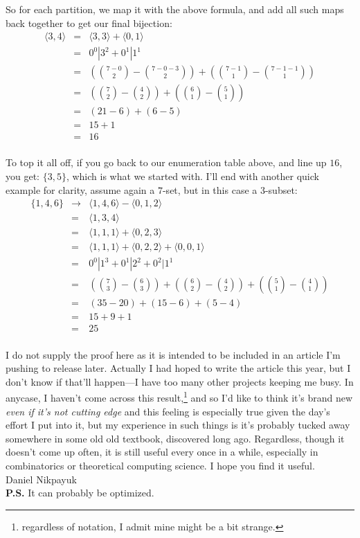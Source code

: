 \documentclass[twoside]{article}
\begin{document}
So for each partition, we map it with the above formula, and add all such maps back together to get our final bijection:
\begin{eqnarray*}
\langle 3, 4\rangle & = & \langle 3, 3\rangle + \langle 0, 1\rangle \\
       & = & 0^0|3^2 + 0^1|1^1 \\
       & = & ({7-0\choose 2} - {7-0-3\choose 2}) + ({7-1\choose 1} - {7-1-1\choose 1}) \\
       & = & ({7\choose 2} - {4\choose 2}) + ({6\choose 1} - {5\choose 1}) \\
       & = & (21 - 6) + (6 - 5) \\
       & = & 15 + 1 \\
       & = & 16 \\
\end{eqnarray*}

To top it all off, if you go back to our enumeration table above, and line up $ 16 $, you get: $ \{3, 5\} $, which is what
we started with.  I'll end with another quick example for clarity, assume again a $ 7 $-set, but in this case a $ 3 $-subset:
\begin{eqnarray*}
\{1, 4, 6\} & \to & \langle 1, 4, 6\rangle - \langle 0, 1, 2\rangle \\
            & = & \langle 1, 3, 4\rangle \\
            & = & \langle 1, 1, 1\rangle + \langle 0, 2, 3\rangle \\
            & = & \langle 1, 1, 1\rangle + \langle 0, 2, 2\rangle + \langle 0, 0, 1\rangle \\
            & = & 0^0|1^3 + 0^1|2^2 + 0^2|1^1 \\
            & = & ({7\choose 3} - {6\choose 3}) + ({6\choose 2} - {4\choose 2}) + ({5\choose 1} - {4\choose 1}) \\
            & = & (35 - 20) + (15 - 6) + (5 - 4) \\
            & = & 15 + 9 + 1 \\
            & = & 25 \\
\end{eqnarray*}

I do not supply the proof here as it is intended to be included in an article I'm pushing to release later. Actually I had hoped
to write the article this year, but I don't know if that'll happen---I have too many other projects keeping me busy. In anycase,
I haven't come across this result,\footnote{regardless of notation, I admit mine might be a bit strange.} and so I'd like to think
it's brand new \emph{even if it's not cutting edge} and this feeling is especially true given the day's effort I put into it,
but my experience in such things is it's probably tucked away somewhere in some old old textbook, discovered long ago. Regardless,
though it doesn't come up often, it is still useful every once in a while, especially in combinatorics or theoretical computing science.
I hope you find it useful.\\[0.5cm]

Daniel Nikpayuk\\[0.5cm]

{\bfseries P.S.} It can probably be optimized.
\end{document}
